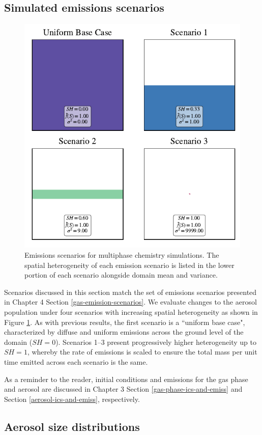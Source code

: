 \subsection{Simulated emissions scenarios}

\begin{figure}[t]
  \centering
    \includegraphics[width=.6\textwidth]{figures/SH-scenarios-main-runs.pdf}
    \caption{Emissions scenarios for multiphase chemistry simulations. The spatial heterogeneity of each emission scenario is listed in the lower portion of each scenario alongside domain mean and variance.
}
    \label{fig:aerosol-emission-scenarios}
\end{figure}

Scenarios discussed in this section match the set of emissions scenarios presented in Chapter 4 Section \ref{gas-emission-scenarios}. We evaluate changes to the aerosol population under four scenarios with increasing spatial heterogeneity as shown in Figure \ref{fig:aerosol-emission-scenarios}. As with previous results, the first scenario is a ``uniform base case", characterized by diffuse and uniform emissions across the ground level of the domain ($SH=0$). Scenarios 1--3 present progressively higher heterogeneity up to $SH=1$, whereby the rate of emissions is scaled to ensure the total mass per unit time emitted across each scenario is the same.

As a reminder to the reader, initial conditions and emissions for the gas phase and aerosol are discussed in Chapter 3 Section \ref{gas-phase-ics-and-emiss} and Section \ref{aerosol-ics-and-emiss}, respectively. 

\subsection{Aerosol size distributions}\label{size-dists}

